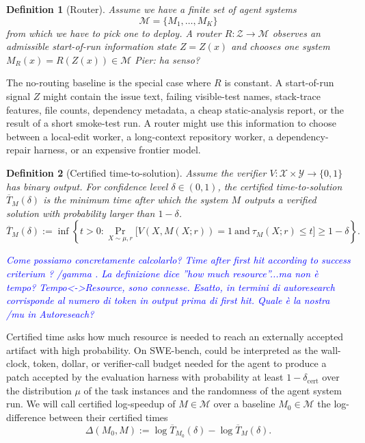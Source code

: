 \documentclass{article}
\newcommand{\pier}[1]{{\color{red}Pier: #1}}
\newtheorem{definition}{Definition}
\newcommand{\cM}{\mathcal{M}}
\begin{document}
\begin{definition}[Router]
\label{def:router}
Assume we have a finite set of agent systems
\[
    \cM=\{M_1,\ldots,M_K\}
\]
from which we have to pick one to deploy.
A router $R:\mathcal Z\to\cM$ observes an admissible start-of-run information state \(Z=Z(x)\) and chooses one system $M_R(x) = R(Z(x)) \in \mathcal{M}$
\pier{ha senso?}
\end{definition}
The no-routing baseline is the special case where \(R\) is constant.
A start-of-run signal \(Z\) might contain the issue text, failing visible-test names, stack-trace features, file counts, dependency metadata, a cheap static-analysis report, or the result of a short smoke-test run.
A router might use this information to choose between a local-edit worker, a long-context repository worker, a dependency-repair harness, or an expensive frontier model.


\begin{definition}[Certified time-to-solution]
\label{def:certified-time}
Assume the verifier $V \colon \mathcal{X} \times \mathcal{Y} \to \{0,1\}$ has binary output.
For confidence level \(\delta\in(0,1)\), the certified time-to-solution $\overline T_M(\delta)$ is the minimum time after which the system $M$ outputs a verified solution with probability larger than $1-\delta$.
\[
    \overline T_M(\delta)
    :=
    \inf\left\{
        t>0:
        \Pr_{X\sim\mu,r}
        \big[
            V(X,M(X;r))=1
            \ \mathrm{and}\
            \tau_M(X;r)\le t
        \big]
        \ge 1-\delta
    \right\}.
\]

\textcolor{blue}{Come possiamo concretamente calcolarlo? Time after first hit according to success criterium ? /gamma . La definizione dice ''how much resource''...ma non è tempo? Tempo<->Resource, sono connesse. Esatto, in termini di autoresearch corrisponde al numero di token in output prima di first hit. Quale è la nostra /mu in Autoreseach?}
\end{definition}
Certified time asks how much resource is needed to reach an externally accepted artifact with high probability.
On SWE-bench, could be interpreted as the wall-clock, token, dollar, or verifier-call budget needed for the agent to produce a patch accepted by the evaluation harness with probability at least \(1-\delta_{\mathrm{cert}}\) over the distribution $\mu$ of the task instances and the randomness of the agent system run.
We will call certified log-speedup of \(M \in \cM \) over a baseline \(M_0 \in \cM\) the log-difference between their certified times
\[
    \Delta(M_0,M)
    :=
    \log \overline T_{M_0}(\delta)
    -
    \log \overline T_M(\delta).
\]
\end{document}
